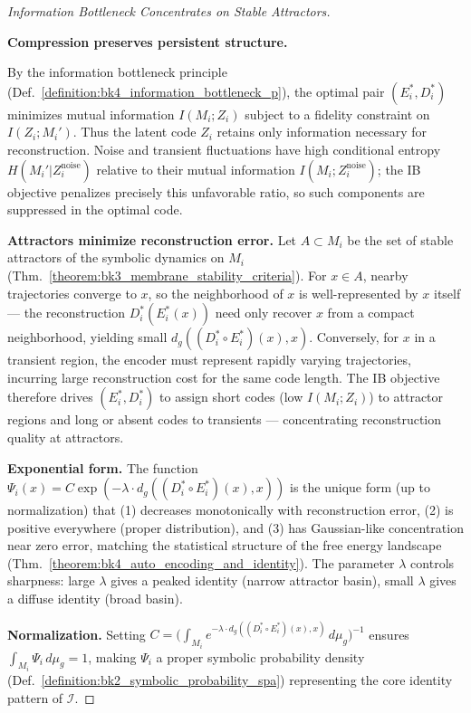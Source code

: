 \begin{proof}[Information Bottleneck Concentrates on Stable Attractors]
\label{proof:bk4_information_bottleneck_symbolic_filter}
\leavevmode

\textbf{Compression preserves persistent structure.}\par
By the information bottleneck principle
(Def.~\ref{definition:bk4_information_bottleneck_p}),
the optimal pair $(E_i^*, D_i^*)$ minimizes mutual information $I(M_i; Z_i)$
subject to a fidelity constraint on $I(Z_i; M_i')$.
Thus the latent code $Z_i$ retains only information necessary for reconstruction.
Noise and transient fluctuations have high conditional entropy $H(M_i'|Z_i^{\text{noise}})$
relative to their mutual information $I(M_i;Z_i^{\text{noise}})$; the IB objective
penalizes precisely this unfavorable ratio, so such components are suppressed in the
optimal code.

\textbf{Attractors minimize reconstruction error.}
Let $A \subset M_i$ be the set of stable attractors of the symbolic dynamics on $M_i$
(Thm.~\ref{theorem:bk3_membrane_stability_criteria}). For $x \in A$, nearby trajectories
converge to $x$, so the neighborhood of $x$ is well-represented by $x$ itself — the
reconstruction $D_i^*(E_i^*(x))$ need only recover $x$ from a compact neighborhood,
yielding small $d_g((D_i^* \circ E_i^*)(x), x)$. Conversely, for $x$ in a transient
region, the encoder must represent rapidly varying trajectories, incurring large
reconstruction cost for the same code length. The IB objective therefore drives
$(E_i^*, D_i^*)$ to assign short codes (low $I(M_i;Z_i)$) to attractor regions and
long or absent codes to transients — concentrating reconstruction quality at attractors.

\textbf{Exponential form.}
The function $\Psi_i(x) = C\exp(-\lambda\cdot d_g((D_i^*\circ E_i^*)(x),x))$ is the
unique form (up to normalization) that (1) decreases monotonically with reconstruction
error, (2) is positive everywhere (proper distribution), and (3) has Gaussian-like
concentration near zero error, matching the statistical structure of the free energy
landscape (Thm.~\ref{theorem:bk4_auto_encoding_and_identity}). The parameter $\lambda$
controls sharpness: large $\lambda$ gives a peaked identity (narrow attractor basin),
small $\lambda$ gives a diffuse identity (broad basin).

\textbf{Normalization.}
Setting $C = \bigl(\int_{M_i}e^{-\lambda\cdot d_g((D_i^*\circ E_i^*)(x),x)}\,d\mu_g\bigr)^{-1}$
ensures $\int_{M_i}\Psi_i\,d\mu_g = 1$, making $\Psi_i$ a proper symbolic probability
density (Def.~\ref{definition:bk2_symbolic_probability_spa}) representing the core
identity pattern of $\mathcal{I}$.
\end{proof}
